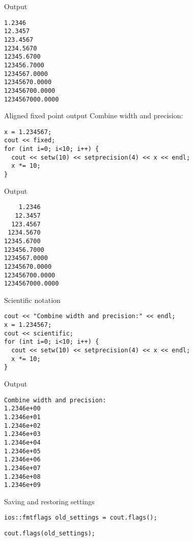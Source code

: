 \begin{block}{Output}
  \label{sl:io-fix-out}
\begin{verbatim}
1.2346
12.3457
123.4567
1234.5670
12345.6700
123456.7000
1234567.0000
12345670.0000
123456700.0000
1234567000.0000
\end{verbatim}
\end{block}

\begin{block}{Aligned fixed point output}
  \label{sl:io-align}
  Combine width and precision:
\begin{verbatim}
x = 1.234567;
cout << fixed;
for (int i=0; i<10; i++) {
  cout << setw(10) << setprecision(4) << x << endl;
  x *= 10;
}
\end{verbatim}
\end{block}

\begin{block}{Output}
  \label{sl:io-align-out}
\begin{verbatim}
    1.2346
   12.3457
  123.4567
 1234.5670
12345.6700
123456.7000
1234567.0000
12345670.0000
123456700.0000
1234567000.0000
\end{verbatim}
\end{block}

\begin{block}{Scientific notation}
  \label{sl:io-sci}
\begin{verbatim}
cout << "Combine width and precision:" << endl;
x = 1.234567;
cout << scientific;
for (int i=0; i<10; i++) {
  cout << setw(10) << setprecision(4) << x << endl;
  x *= 10;
}
\end{verbatim}
\end{block}

\begin{block}{Output}
  \label{sl:io-sci-out}
\begin{verbatim}
Combine width and precision:
1.2346e+00
1.2346e+01
1.2346e+02
1.2346e+03
1.2346e+04
1.2346e+05
1.2346e+06
1.2346e+07
1.2346e+08
1.2346e+09
\end{verbatim}
\end{block}

 {Saving and restoring settings}

\begin{verbatim}
ios::fmtflags old_settings = cout.flags();
\end{verbatim}

\begin{verbatim}
cout.flags(old_settings);
\end{verbatim}

